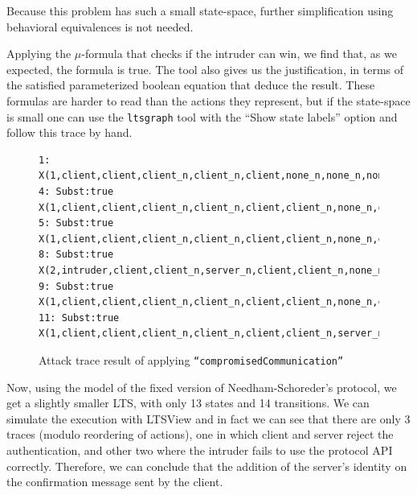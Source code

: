 \documentclass[11pt]{article}
\theoremstyle{definition}
\theoremstyle{plain}
\theoremstyle{definition}
\begin{document}
\begin{appendices}
Because this problem has such a small state-space, further simplification using behavioral equivalences is not needed.

Applying the $ \mu $-formula that checks if the intruder can win, we find that, as we expected, the formula is true. The tool also gives us the justification, in terms of the satisfied parameterized boolean equation that deduce the result. These formulas are harder to read than the actions they represent, but if the state-space is small one can use the \texttt{ltsgraph} tool with the ``Show state labels'' option and follow this trace by hand.
\begin{figure}[h]
\begin{lstlisting}
1: X(1,client,client,client_n,client_n,client,none_n,none_n,none,false,1,client,client_n,client,intruder,1,client,client,client_n,client_n,client,client)
4: Subst:true X(1,client,client,client_n,client_n,client,client_n,none_n,client,false,2,client,client_n,client,intruder,1,client,client,client_n,client_n,client,client)
5: Subst:true X(1,client,client,client_n,client_n,client,client_n,none_n,client,false,2,client,client_n,client,intruder,2,server,intruder,client_n,server_n,client,intruder)
8: Subst:true X(2,intruder,client,client_n,server_n,client,client_n,none_n,client,false,2,client,client_n,client,intruder,3,client,client,client_n,client_n,client,intruder)
9: Subst:true X(1,client,client,client_n,client_n,client,client_n,none_n,client,false,3,client,server_n,intruder,intruder,3,client,client,client_n,client_n,client,intruder)
11: Subst:true X(1,client,client,client_n,client_n,client,client_n,server_n,client,false,4,client,client_n,client,client,3,client,client,client_n,client_n,client,intruder)
\end{lstlisting}
\caption{Attack trace result of applying \texttt{``compromisedCommunication''}}
\end{figure}

Now, using the model of the fixed version of Needham-Schoreder's protocol, we get a slightly smaller LTS, with only 13 states and 14 transitions. We can simulate the execution with LTSView and in fact we can see that there are only 3 traces (modulo reordering of actions), one in which client and server reject the authentication, and other two where the intruder fails to use the protocol API correctly. Therefore, we can conclude that the addition of the server's identity on the confirmation message sent by the client.


\end{appendices}
\end{document}
